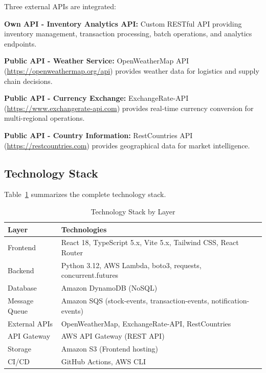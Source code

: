 \documentclass[conference]{IEEEtran}
\begin{document}
Three external APIs are integrated:

\textbf{Own API - Inventory Analytics API:} Custom RESTful API providing inventory management, transaction processing, batch operations, and analytics endpoints.

\textbf{Public API - Weather Service:} OpenWeatherMap API (\url{https://openweathermap.org/api}) provides weather data for logistics and supply chain decisions.

\textbf{Public API - Currency Exchange:} ExchangeRate-API (\url{https://www.exchangerate-api.com}) provides real-time currency conversion for multi-regional operations.

\textbf{Public API - Country Information:} RestCountries API (\url{https://restcountries.com}) provides geographical data for market intelligence.

\subsection{Technology Stack}

Table~\ref{tab:techstack} summarizes the complete technology stack.

\begin{table}[!t]
\caption{Technology Stack by Layer}
\label{tab:techstack}
\centering
\small
\begin{tabular}{p{2.0cm}p{5.5cm}}
\toprule
\textbf{Layer} & \textbf{Technologies} \\
\midrule
Frontend & React 18, TypeScript 5.x, Vite 5.x, Tailwind CSS, React Router \\
\midrule
Backend & Python 3.12, AWS Lambda, boto3, requests, concurrent.futures \\
\midrule
Database & Amazon DynamoDB (NoSQL) \\
\midrule
Message Queue & Amazon SQS (stock-events, transaction-events, notification-events) \\
\midrule
External APIs & OpenWeatherMap, ExchangeRate-API, RestCountries \\
\midrule
API Gateway & AWS API Gateway (REST API) \\
\midrule
Storage & Amazon S3 (Frontend hosting) \\
\midrule
CI/CD & GitHub Actions, AWS CLI \\
\bottomrule
\end{tabular}
\end{table}

\end{document}
